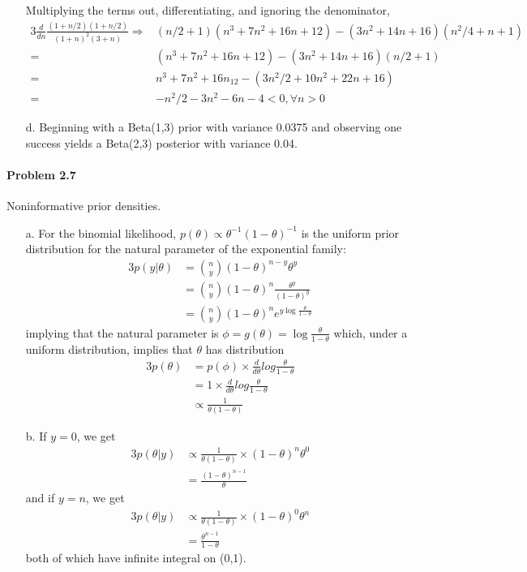 \documentclass[10pt]{article}
\begin{document}
\begin{enumerate}
Multiplying the terms out, differentiating, and ignoring the denominator,
\begin{alignat*}{3}
\frac{d}{dn}\frac{(1+n/2)(1+n/2)}{(1+n)^2(3+n)}\Rightarrow & (n/2+1)(n^3+7n^2+16n+12)-(3n^2+14n+16)(n^2/4+n+1) \\
=& (n^3+7n^2+16n+12)-(3n^2+14n+16)(n/2+1) \\
=& n^3 + 7n^2 + 16n _ 12 - (3n^2/2+10n^2+22n+16) \\
=& -n^2/2 -3n^2-6n-4 <0, \forall n>0
\end{alignat*}

\item[d.] Beginning with a Beta(1,3) prior with variance 0.0375 and observing one success yields a Beta(2,3) posterior with variance 0.04.

\end{enumerate}

\paragraph{Problem 2.7} Noninformative prior densities.

\begin{enumerate}
\item[a.] For the binomial likelihood, $p(\theta)\propto \theta^{-1}(1-\theta)^{-1}$ is the uniform prior distribution for the natural parameter of the exponential family:
\begin{alignat*}{3}
p(y|\theta)&=\binom{n}{y}(1-\theta)^{n-y}\theta^y \\
&=\binom{n}{y}(1-\theta)^{n}\frac{\theta^y}{(1-\theta)^y} \\
&=\binom{n}{y}(1-\theta)^{n}e^{y \log \frac{\theta}{1-\theta}}
\end{alignat*}
implying that the natural parameter is $\phi = g(\theta)= \log \frac{\theta}{1-\theta}$ which, under a uniform distribution, implies that $\theta$ has distribution
\begin{alignat*}{3}
p(\theta)&=p(\phi)\times\frac{d}{d\theta}log \frac{\theta}{1-\theta} \\
&=1 \times \frac{d}{d\theta}log \frac{\theta}{1-\theta} \\
&\propto \frac{1}{\theta(1-\theta)}
\end{alignat*}

\item[b.] If $y=0$, we get
\begin{alignat*}{3}
p(\theta | y) & \propto \frac{1}{\theta(1-\theta)} \times (1-\theta)^{n}\theta^0 \\
&= \frac{(1-\theta)^{n-1}}{\theta}
\end{alignat*}
and if $y=n$, we get
\begin{alignat*}{3}
p(\theta | y) & \propto \frac{1}{\theta(1-\theta)} \times (1-\theta)^{0}\theta^n \\
&= \frac{\theta^{n-1}}{1-\theta}
\end{alignat*}
both of which have infinite integral on (0,1).
\end{enumerate}
\end{document}
